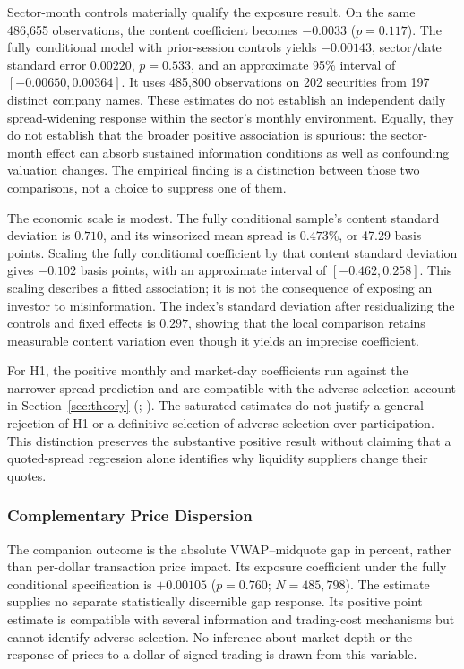 \documentclass{article}
\theoremstyle{plain}
\begin{document}
Sector-month controls materially qualify the exposure result. On the same 486,655 observations, the content coefficient becomes $-0.0033$ ($p=0.117$). The fully conditional model with prior-session controls yields $-0.00143$, sector/date standard error $0.00220$, $p=0.533$, and an approximate 95\% interval of $[-0.00650,0.00364]$. It uses 485,800 observations on 202 securities from 197 distinct company names. These estimates do not establish an independent daily spread-widening response within the sector's monthly environment. Equally, they do not establish that the broader positive association is spurious: the sector-month effect can absorb sustained information conditions as well as confounding valuation changes. The empirical finding is a distinction between those two comparisons, not a choice to suppress one of them.

The economic scale is modest. The fully conditional sample's content standard deviation is $0.710$, and its winsorized mean spread is $0.473\%$, or 47.29 basis points. Scaling the fully conditional coefficient by that content standard deviation gives $-0.102$ basis points, with an approximate interval of $[-0.462,0.258]$. This scaling describes a fitted association; it is not the consequence of exposing an investor to misinformation. The index's standard deviation after residualizing the controls and fixed effects is $0.297$, showing that the local comparison retains measurable content variation even though it yields an imprecise coefficient.

For H1, the positive monthly and market-day coefficients run against the narrower-spread prediction and are compatible with the adverse-selection account in Section~\ref{sec:theory} (\cite{GlostenMilgrom1985}; \cite{EasleyOHara1992}). The saturated estimates do not justify a general rejection of H1 or a definitive selection of adverse selection over participation. This distinction preserves the substantive positive result without claiming that a quoted-spread regression alone identifies why liquidity suppliers change their quotes.

\subsubsection{Complementary Price Dispersion}
\label{sec:results_priceimpact}
The companion outcome is the absolute VWAP--midquote gap in percent, rather than per-dollar transaction price impact. Its exposure coefficient under the fully conditional specification is $+0.00105$ ($p=0.760$; $N=485{,}798$). The estimate supplies no separate statistically discernible gap response. Its positive point estimate is compatible with several information and trading-cost mechanisms but cannot identify adverse selection. No inference about market depth or the response of prices to a dollar of signed trading is drawn from this variable.
\end{document}

